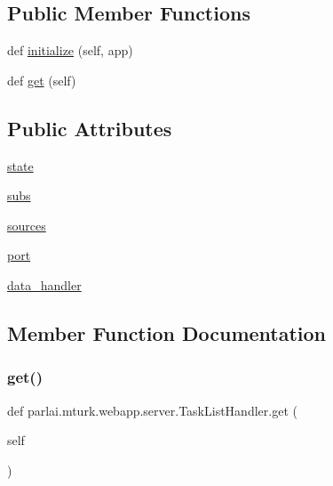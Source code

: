 \subsection*{Public Member Functions}
\begin{DoxyCompactItemize}
\item 
def \hyperlink{classparlai_1_1mturk_1_1webapp_1_1server_1_1TaskListHandler_a65f561e308d076bc129463480e83ffe5}{initialize} (self, app)
\item 
def \hyperlink{classparlai_1_1mturk_1_1webapp_1_1server_1_1TaskListHandler_ab7ff1ab2120e64b2f23aadb29d4eeac9}{get} (self)
\end{DoxyCompactItemize}
\subsection*{Public Attributes}
\begin{DoxyCompactItemize}
\item 
\hyperlink{classparlai_1_1mturk_1_1webapp_1_1server_1_1TaskListHandler_a130bda83b244ddc1ef7c461a10d90ce9}{state}
\item 
\hyperlink{classparlai_1_1mturk_1_1webapp_1_1server_1_1TaskListHandler_a9cbeab910d93da1b08334339c3a93bdf}{subs}
\item 
\hyperlink{classparlai_1_1mturk_1_1webapp_1_1server_1_1TaskListHandler_a7ebaf2e0e17b3caa6052a3ca975dbda9}{sources}
\item 
\hyperlink{classparlai_1_1mturk_1_1webapp_1_1server_1_1TaskListHandler_aeb14ed26510ea0b82bb22608b4073709}{port}
\item 
\hyperlink{classparlai_1_1mturk_1_1webapp_1_1server_1_1TaskListHandler_a2325ea777c0b0807a28d7bbbf9eb422b}{data\+\_\+handler}
\end{DoxyCompactItemize}


\subsection{Member Function Documentation}
\mbox{\label{classparlai_1_1mturk_1_1webapp_1_1server_1_1TaskListHandler_ab7ff1ab2120e64b2f23aadb29d4eeac9}} 
\subsubsection{\texorpdfstring{get()}{get()}}
{\footnotesize\ttfamily def parlai.\+mturk.\+webapp.\+server.\+Task\+List\+Handler.\+get (\begin{DoxyParamCaption}\item[{}]{self }\end{DoxyParamCaption})}

